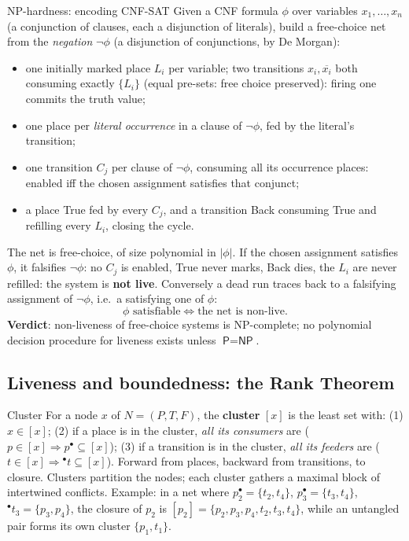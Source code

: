 \begin{notebox}{NP-hardness: encoding CNF-SAT}
Given a CNF formula $\phi$ over variables $x_1, \ldots, x_n$ (a conjunction of clauses, each a disjunction of literals), build a free-choice net from the \emph{negation} $\neg\phi$ (a disjunction of conjunctions, by De Morgan):
\begin{itemize}
  \item one initially marked place $L_i$ per variable; two transitions $x_i, \overline{x_i}$ both consuming exactly $\{L_i\}$ (equal pre-sets: free choice preserved): firing one commits the truth value;
  \item one place per \emph{literal occurrence} in a clause of $\neg\phi$, fed by the literal's transition;
  \item one transition $C_j$ per clause of $\neg\phi$, consuming all its occurrence places: enabled iff the chosen assignment satisfies that conjunct;
  \item a place \textsf{True} fed by every $C_j$, and a transition \textsf{Back} consuming \textsf{True} and refilling every $L_i$, closing the cycle.
\end{itemize}
The net is free-choice, of size polynomial in $|\phi|$. If the chosen assignment satisfies $\phi$, it falsifies $\neg\phi$: no $C_j$ is enabled, \textsf{True} never marks, \textsf{Back} dies, the $L_i$ are never refilled: the system is \textbf{not live}. Conversely a dead run traces back to a falsifying assignment of $\neg\phi$, i.e.\ a satisfying one of $\phi$:
\[
  \phi \text{ satisfiable} \iff \text{the net is non-live}.
\]
\textbf{Verdict}: non-liveness of free-choice systems is \textsf{NP}-complete; no polynomial decision procedure for liveness exists unless $\textsf{P} = \textsf{NP}$.
\end{notebox}

\subsection{Liveness and boundedness: the Rank Theorem}

\begin{definitionbox}{Cluster}
For a node $x$ of $N = (P, T, F)$, the \textbf{cluster} $[x]$ is the least set with: (1) $x \in [x]$; (2) if a place is in the cluster, \emph{all its consumers} are ($p \in [x] \Rightarrow p^\bullet \subseteq [x]$); (3) if a transition is in the cluster, \emph{all its feeders} are ($t \in [x] \Rightarrow {}^\bullet t \subseteq [x]$). Forward from places, backward from transitions, to closure. Clusters partition the nodes; each cluster gathers a maximal block of intertwined conflicts. Example: in a net where $p_2^\bullet = \{t_2, t_4\}$, $p_3^\bullet = \{t_3, t_4\}$, ${}^\bullet t_3 = \{p_3, p_4\}$, the closure of $p_2$ is $[p_2] = \{p_2, p_3, p_4, t_2, t_3, t_4\}$, while an untangled pair forms its own cluster $\{p_1, t_1\}$.
\end{definitionbox}

